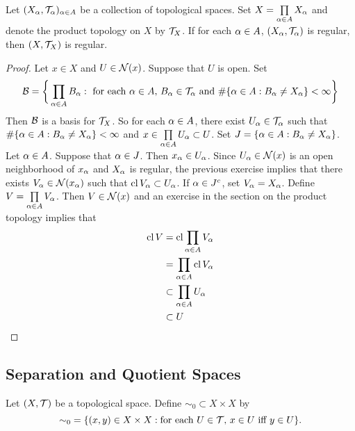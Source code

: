 \documentclass{book}
\begin{document}
	\begin{ex} 
		Let $(X_{\alpha}, \mathcal{T}_{\alpha})_{\alpha \in A}$ be a collection of topological spaces. Set $X = \prod\limits_{\alpha \in A} X_{\alpha}$ and denote the product topology on $X$ by $\mathcal{T}_X$. If for each $\alpha \in A$, $(X_{\alpha}, \mathcal{T}_{\alpha})$ is regular, then $(X, \mathcal{T}_X)$ is regular. 
	\end{ex}

	\begin{proof}
		Let $x \in X$ and $U \in \mathcal{N}(x)$. Suppose that $U$ is open. Set 
		$$\mathcal{B} = \bigg \{\prod_{\alpha \in A}B_{\alpha}: \text{ for each $\alpha \in A$,  $B_{\alpha} \in \mathcal{T}_{\alpha}$ and $\# \{\alpha \in A: B_{\alpha} \neq X_{\alpha}\} < \infty$} \bigg\}$$
		Then $\mathcal{B}$ is a basis for $\mathcal{T}_{X}$. So for each $\alpha \in A$, there exist $U_{\alpha} \in \mathcal{T}_{\alpha}$ such that $\# \{\alpha \in A: B_{\alpha} \neq X_{\alpha}\} < \infty$ and $x \in \prod\limits_{\alpha \in A} U_{\alpha} \subset U$. Set $J = \{\alpha \in A: B_{\alpha} \neq X_{\alpha}\}$. Let $\alpha \in A$. Suppose that $\alpha \in J$. Then $x_{\alpha} \in U_{\alpha}$. Since $U_{\alpha} \in \mathcal{N}(x)$ is an open neighborhood of $x_{\alpha}$ and $X_{\alpha}$ is regular, the previous exercise implies that there exists $V_{\alpha} \in \mathcal{N}(x_{\alpha})$ such that $\operatorname{cl} V_{\alpha} \subset U_{\alpha}$. If $\alpha \in J^c$, set $V_{\alpha} = X_{\alpha}$. Define $V = \prod\limits_{\alpha \in A} V_{\alpha}$. Then $V \in \mathcal{N}(x)$ and an exercise in the section on the product topology implies that 
		\begin{align*}
			\operatorname{cl} V
			& = \operatorname{cl} \prod_{\alpha \in A} V_{\alpha} \\
			& = \prod_{\alpha \in A} \operatorname{cl} V_{\alpha} \\
			& \subset \prod_{\alpha \in A} U_{\alpha} \\
			& \subset U
		\end{align*} 
	\end{proof}
	
	
	
	
	
	
	
	
	
	
	
	
	
	
	
	
	
	\subsection{Separation and Quotient Spaces}
	
	\begin{defn} 
		Let $(X, \mathcal{T})$ be a topological space. Define $\sim_0 \subset X \times X$ by
		$${\sim_0}  = \{(x,y) \in X \times X: \text{for each $U \in \mathcal{T}$, $x \in U$ iff $y \in U$}\}.$$
	\end{defn}
\end{document}
